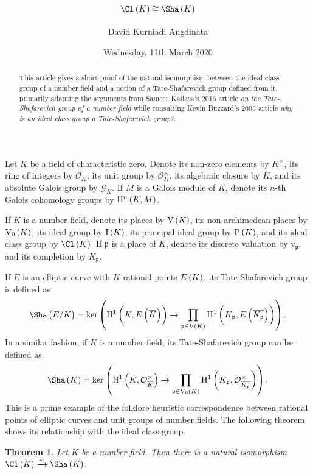 \documentclass{article}
\title{$ \Cl\br{K} \cong \Sha\br{K} $}
\author{David Kurniadi Angdinata}
\date{Wednesday, 11th March 2020}
\newtheorem*{theorem}{Theorem}
\newcommand{\br}{\del}                              %
\newcommand{\GGG}{\mathcal{G}} %
\newcommand{\OOO}{\mathcal{O}} %
\newcommand{\ppp}{\mathfrak{p}}   %
\renewcommand{\H}{\mathrm{H}} %
\newcommand{\I}{\mathrm{I}}   %
\renewcommand{\P}{\mathrm{P}} %
\newcommand{\V}{\mathrm{V}}   %
\renewcommand{\v}{\mathrm{v}} %
\begin{document}
\maketitle

\begin{abstract}
This article gives a short proof of the natural isomorphism between the ideal class group of a number field and a notion of a Tate-Shafarevich group defined from it, primarily adapting the arguments from Sameer Kailasa's 2016 article \emph{on the Tate-Shafarevich group of a number field} while consulting Kevin Buzzard's 2005 article \emph{why is an ideal class group a Tate-Shafarevich group?}.
\end{abstract}

\vspace{0.5cm}

Let $ K $ be a field of characteristic zero. Denote its non-zero elements by $ K^\times $, its ring of integers by $ \OOO_K $, its unit group by $ \OOO_K^\times $, its algebraic closure by $ \overline{K} $, and its absolute Galois group by $ \GGG_K $. If $ M $ is a Galois module of $ K $, denote its $ n $-th Galois cohomology groups by $ \H^n\br{K, M} $.

If $ K $ is a number field, denote its places by $ \V\br{K} $, its non-archimedean places by $ \V_0\br{K} $, its ideal group by $ \I\br{K} $, its principal ideal group by $ \P\br{K} $, and its ideal class group by $ \Cl\br{K} $. If $ \ppp $ is a place of $ K $, denote its discrete valuation by $ \v_\ppp $, and its completion by $ K_\ppp $.

If $ E $ is an elliptic curve with $ K $-rational points $ E\br{K} $, its Tate-Shafarevich group is defined as
$$ \Sha\br{E / K} = \ker \br{\H^1\br{K, E\br{\overline{K}}} \to \prod_{\ppp \in \V\br{K}} \H^1\br{K_\ppp, E\br{\overline{K_\ppp}}}}. $$
In a similar fashion, if $ K $ is a number field, its Tate-Shafarevich group can be defined as
$$ \Sha\br{K} = \ker \br{\H^1\br{K, \OOO_{\overline{K}}^\times} \to \prod_{\ppp \in \V_0\br{K}} \H^1\br{K_\ppp, \OOO_{\overline{K_\ppp}}^\times}}. $$
This is a prime example of the folklore heuristic correspondence between rational points of elliptic curves and unit groups of number fields. The following theorem shows its relationship with the ideal class group.

\begin{theorem}
Let $ K $ be a number field. Then there is a natural isomorphism $ \Cl\br{K} \xrightarrow{\sim} \Sha\br{K} $.
\end{theorem}
\end{document}

